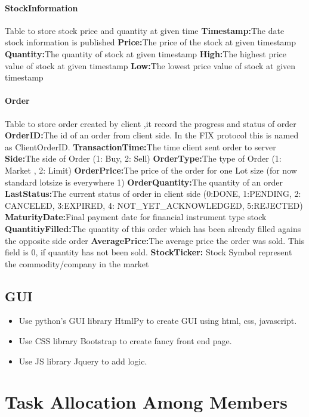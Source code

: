 \documentclass[a4paper, 11pt]{article}
\begin{document}
\paragraph*{StockInformation}
Table to store stock price and quantity at given time
\textbf{Timestamp:}The date stock information is published
\textbf{Price:}The price of the stock at given timestamp 
\textbf{Quantity:}The quantity of stock at given timestamp 
\textbf{High:}The highest price value of stock at given timestamp
\textbf{Low:}The lowest price value of stock at given timestamp

\paragraph*{Order}
Table to store order created by client ,it record the progress and status of order
\textbf{OrderID:}The id of an order from client side. In the FIX protocol this is named as ClientOrderID.
\textbf{TransactionTime:}The time client sent order to server 
\textbf{Side:}The side of Order (1: Buy, 2: Sell)
\textbf{OrderType:}The type of Order (1: Market , 2: Limit)
\textbf{OrderPrice:}The price of the order for one Lot size (for now standard lotsize is everywhere 1)
\textbf{OrderQuantity:}The quantity of an order
\textbf{LastStatus:}The current status of order in client side (0:DONE, 1:PENDING, 2: CANCELED, 3:EXPIRED, 4: NOT_YET_ACKNOWLEDGED, 5:REJECTED)
\textbf{MaturityDate:}Final payment date for financial instrument type stock
\textbf{QuantitiyFilled:}The quantity of this order which has been already filled agains the opposite side order
\textbf{AveragePrice:}The average price the order was sold. This field is 0, if quantity has  not been sold.
\textbf{StockTicker:} Stock Symbol represent the commodity/company in the market

\subsection*{GUI}
\begin{itemize}
  \item Use python's GUI library HtmlPy to create GUI using html, css, javascript.
  \item Use CSS library Bootstrap to create fancy front end page. 
  \item Use JS library Jquery to add logic.
\end{itemize}




\section*{Task Allocation Among Members}
\end{document}
